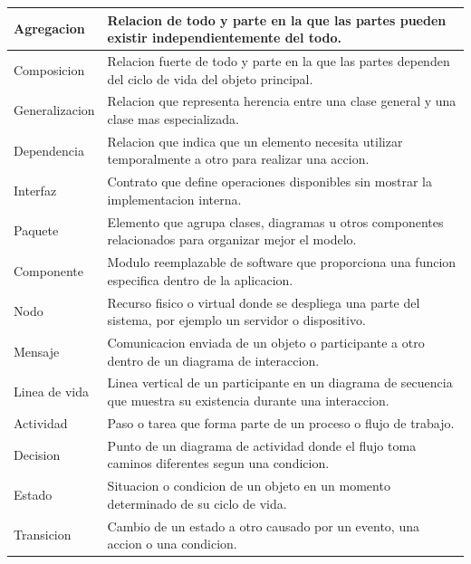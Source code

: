\documentclass[12pt,letterpaper]{article}
\begin{document}
\begin{longtable}{|p{3.8cm}|p{11.1cm}|}
Agregacion & Relacion de todo y parte en la que las partes pueden existir independientemente del todo. \\
\hline

Composicion & Relacion fuerte de todo y parte en la que las partes dependen del ciclo de vida del objeto principal. \\
\hline

Generalizacion & Relacion que representa herencia entre una clase general y una clase mas especializada. \\
\hline

Dependencia & Relacion que indica que un elemento necesita utilizar temporalmente a otro para realizar una accion. \\
\hline

Interfaz & Contrato que define operaciones disponibles sin mostrar la implementacion interna. \\
\hline

Paquete & Elemento que agrupa clases, diagramas u otros componentes relacionados para organizar mejor el modelo. \\
\hline

Componente & Modulo reemplazable de software que proporciona una funcion especifica dentro de la aplicacion. \\
\hline

Nodo & Recurso fisico o virtual donde se despliega una parte del sistema, por ejemplo un servidor o dispositivo. \\
\hline

Mensaje & Comunicacion enviada de un objeto o participante a otro dentro de un diagrama de interaccion. \\
\hline

Linea de vida & Linea vertical de un participante en un diagrama de secuencia que muestra su existencia durante una interaccion. \\
\hline

Actividad & Paso o tarea que forma parte de un proceso o flujo de trabajo. \\
\hline

Decision & Punto de un diagrama de actividad donde el flujo toma caminos diferentes segun una condicion. \\
\hline

Estado & Situacion o condicion de un objeto en un momento determinado de su ciclo de vida. \\
\hline

Transicion & Cambio de un estado a otro causado por un evento, una accion o una condicion. \\
\hline


\end{longtable}
\end{document}
